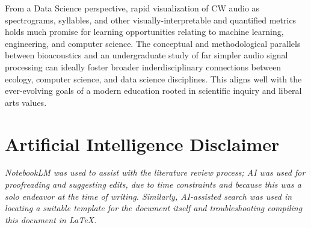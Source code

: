 \documentclass[letterpaper, 12 pt, conference]{ieeeconf}
\begin{document}
    From a Data Science perspective, rapid visualization of CW audio as spectrograms, syllables, and other visually-interpretable and quantified metrics holds much promise for learning opportunities relating to machine learning, engineering, and computer science. The conceptual and methodological parallels between bioacoustics and an undergraduate study of far simpler audio signal processing can ideally foster broader inderdisciplinary connections between ecology, computer science, and data science disciplines. This aligns well with the ever-evolving goals of a modern education rooted in scientific inquiry and liberal arts values.

\section{Artificial Intelligence Disclaimer}
\textsl{NotebookLM was used to assist with the literature review process; AI was used for proofreading and suggesting edits, due to time constraints and because this was a solo endeavor at the time of writing. Similarly, AI-assisted search was used in locating a suitable template for the document itself and troubleshooting compiling this document in \LaTeX.}

\addtolength{\textheight}{-12cm}   %

\AtEndDocument{\printbibliography}

\end{document}

